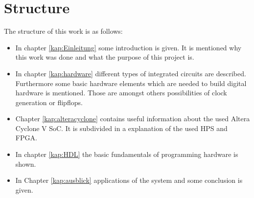 \section{Structure}
The structure of this work is as follows:
\begin{itemize}
\item In chapter \ref{kap:Einleitung} some introduction is given. It is mentioned why this work was done and what the purpose of this project is.
\item In chapter \ref{kap:hardware} different types of integrated circuits are described. Furthermore some basic hardware elements which are needed to build digital hardware is mentioned. Those are amongst others possibilities of clock generation or flipflops.
\item Chapter \ref{kap:alteracyclone} contains useful information about the used Altera Cyclone V SoC. It is subdivided in a explanation of the used HPS and FPGA.
\item In chapter \ref{kap:HDL} the basic fundamentals of programming hardware is shown.
\item In Chapter \ref{kap:ausblick} applications of the system and some conclusion is given.
\end{itemize}